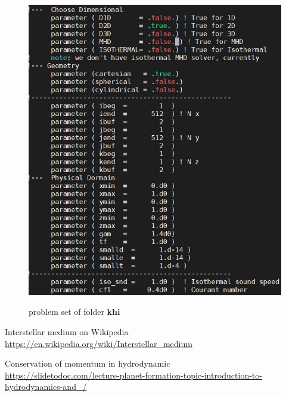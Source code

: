 \documentclass{article}
\begin{document}
\begin{figure}[h]
{        \includegraphics[scale=0.43]{parameter.jpg}
        \label{fig:2khi_parameter} 
    }
    \caption{problem set of folder \textbf{khi}}
    \label{fig:2khi}
\end{figure}




\begin{thebibliography}{00}

Interstellar medium on Wikipedia\\
 \href{https://en.wikipedia.org/wiki/Interstellar\_medium}{https://en.wikipedia.org/wiki/Interstellar\_medium}
 
Conservation of momentum in hydrodynamic \\
\href{https://slidetodoc.com/lecture-planet-formation-topic-introduction-to-hydrodynamics-and/}{https://slidetodoc.com/lecture-planet-formation-topic-introduction-to-hydrodynamics-and\_/}

\end{thebibliography}
\end{document}
